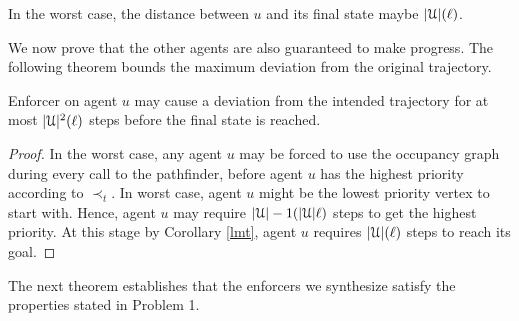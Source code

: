 \begin{cor}
In the worst case, the distance between $u$ and its final state maybe $|\mathcal{U}|(\ell)$.
\label{lmt}
\end{cor}
We now prove that the other agents are also guaranteed to make progress. The following theorem bounds the maximum deviation from the original trajectory.

\begin{lemma}
Enforcer on agent $u$ may cause a deviation from the intended trajectory for at most $|\mathcal{U}|^2(\ell)$ steps before the final state is reached. 
\label{lemma:main}
\end{lemma}
\begin{proof}
In the worst case, any agent $u$ may be forced to use the occupancy graph during every call to the pathfinder, before agent $u$ has the highest priority according to $\prec_t$. In worst case, agent $u$ might be the lowest priority vertex to start with. Hence, agent $u$ may require $|\mathcal{U}|-1(|\mathcal{U}|\ell)$ steps to get the highest priority. At this stage by Corollary \ref{lmt}, agent $u$ requires $|\mathcal{U}|(\ell)$ steps to reach its goal. 
\end{proof}

The next theorem establishes that the enforcers we synthesize satisfy the properties stated in Problem 1.

